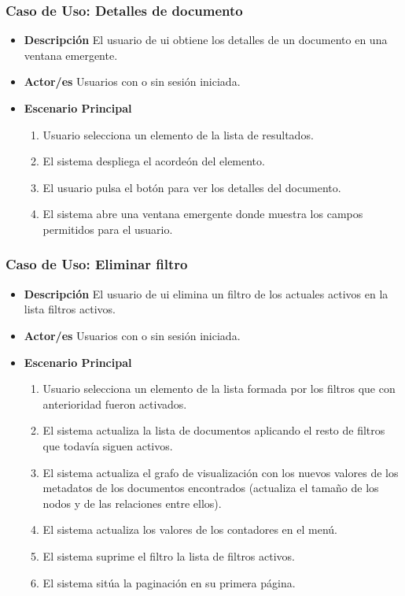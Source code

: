 \subsubsection{Caso de Uso: Detalles de documento}
\begin{itemize}
	\item{\textbf{Descripción}} El usuario de \gls{ui} obtiene los detalles de un documento en una ventana emergente.
    \item{\textbf{Actor/es}} Usuarios con o sin sesión iniciada.
    \item{\textbf{Escenario Principal}}
    	\begin{enumerate}
        	\item Usuario selecciona un elemento de la lista de resultados.
        	\item El sistema despliega el acordeón del elemento.
            \item El usuario pulsa el botón para ver los detalles del documento.
            \item El sistema abre una ventana emergente donde muestra los campos permitidos para el usuario.
        \end{enumerate}
\end{itemize}

\subsubsection{Caso de Uso: Eliminar filtro}
\begin{itemize}
	\item{\textbf{Descripción}} El usuario de \gls{ui} elimina un filtro de los actuales activos en la lista filtros activos.
    \item{\textbf{Actor/es}} Usuarios con o sin sesión iniciada.
    \item{\textbf{Escenario Principal}}
    	\begin{enumerate}
        	\item Usuario selecciona un elemento de la lista formada por los filtros que con anterioridad fueron activados.
			\item El sistema actualiza la lista de documentos aplicando el resto de filtros que todavía siguen activos.
            \item El sistema actualiza el grafo de visualización con los nuevos valores de los \glspl{metadato} de los documentos encontrados (actualiza el tamaño de los nodos y de las relaciones entre ellos).
            \item El sistema actualiza los valores de los contadores en el menú.
            \item El sistema suprime el filtro la lista de filtros activos.
            \item El sistema sitúa la paginación en su primera página.
        \end{enumerate}
\end{itemize}


